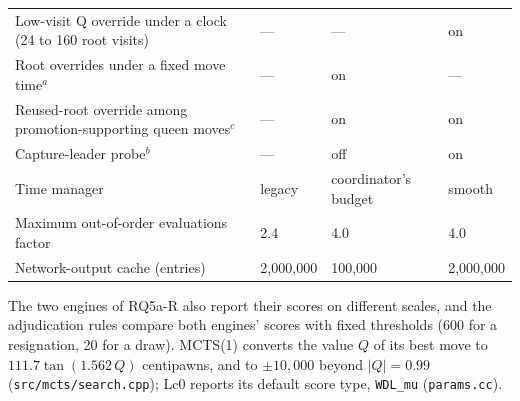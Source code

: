 \documentclass{article}
\begin{document}
\begin{table}[ht]
\begin{tabular}{llll}
Low-visit Q override under a clock (24 to 160 root visits) & --- & --- & on \\
Root overrides under a fixed move time$^{a}$ & --- & on & --- \\
Reused-root override among promotion-supporting queen moves$^{c}$ & --- & on & on \\
Capture-leader probe$^{b}$ & --- & off & on \\
Time manager & legacy & coordinator's budget & smooth \\
Maximum out-of-order evaluations factor & 2.4 & 4.0 & 4.0 \\
Network-output cache (entries) & 2{,}000{,}000 & 100{,}000 & 2{,}000{,}000 \\
\bottomrule
\end{tabular}
\end{table}
The two engines of RQ5a-R also report their scores on different scales, and the adjudication rules compare both engines' scores with fixed thresholds (600 for a resignation, 20 for a draw). MCTS(1) converts the value $Q$ of its best move to $111.7\tan(1.562\,Q)$ centipawns, and to $\pm 10{,}000$ beyond $|Q| = 0.99$ (\texttt{src/mcts/search.cpp}); Lc0 reports its default score type, \texttt{WDL\_mu} (\texttt{params.cc}).
\end{document}
